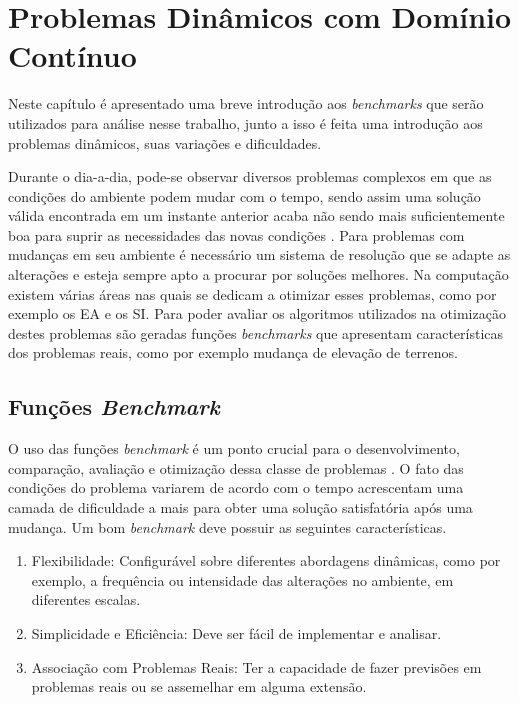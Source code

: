 \chapter{Problemas Dinâmicos com Domínio Contínuo}
\label{ch:problemas}
Neste capítulo é apresentado uma breve introdução aos \textit{benchmarks} que serão utilizados para análise nesse trabalho, junto a isso é feita uma introdução aos problemas dinâmicos, suas variações e dificuldades.

Durante o dia-a-dia, pode-se observar diversos problemas complexos em que as condições do ambiente podem mudar com o tempo, sendo assim uma solução válida encontrada em um instante anterior acaba não sendo mais suficientemente boa para suprir as necessidades das novas condições \cite{branke2012evolutionary}. Para problemas com mudanças em seu ambiente é necessário um sistema de resolução que se adapte as alterações e esteja sempre apto a procurar por soluções melhores. Na computação existem várias áreas nas quais se dedicam a otimizar esses problemas, como por exemplo os EA e os SI. Para poder avaliar os algoritmos utilizados na otimização destes problemas são geradas funções \textit{benchmarks} que apresentam características dos problemas reais, como por exemplo mudança de elevação de terrenos.

\section{Funções \textit{Benchmark}}
\label{sec:revisao_benchmark}
O uso das funções \textit{benchmark} é um ponto crucial para o desenvolvimento, comparação, avaliação e otimização dessa classe de problemas \cite{evolution_dynamic}. O fato das condições do problema variarem de acordo com o tempo acrescentam uma camada de dificuldade a mais para obter uma solução satisfatória após uma mudança. Um bom \textit{benchmark} deve possuir as seguintes características.

\begin{enumerate}  
\item Flexibilidade: Configurável sobre diferentes abordagens dinâmicas, como por exemplo, a frequência ou intensidade das alterações no ambiente, em diferentes escalas.

\item Simplicidade e Eficiência: Deve ser fácil de implementar e analisar.

\item Associação com Problemas Reais: Ter a capacidade de fazer previsões em problemas reais ou se assemelhar em alguma extensão.
\end{enumerate}


